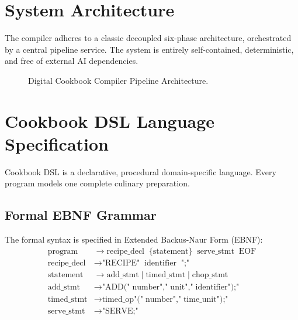 \documentclass[conference]{IEEEtran}
\begin{document}
\section{System Architecture}
The compiler adheres to a classic decoupled six-phase architecture, orchestrated by a central pipeline service. The system is entirely self-contained, deterministic, and free of external AI dependencies.

\begin{figure}[htbp]
\centering
{}
\caption{Digital Cookbook Compiler Pipeline Architecture.}
\label{fig:architecture}
\end{figure}

\section{Cookbook DSL Language Specification}
Cookbook DSL is a declarative, procedural domain-specific language. Every program models one complete culinary preparation.

\subsection{Formal EBNF Grammar}
The formal syntax is specified in Extended Backus-Naur Form (EBNF):
\begin{align*}
\text{program} &\to \text{recipe\_decl}\;\;\{\text{statement}\}\;\;\text{serve\_stmt}\;\;\text{EOF} \\
\text{recipe\_decl} &\to \text{"RECIPE"}\;\;\text{identifier}\;\;\text{";"} \\
\text{statement} &\to \text{add\_stmt} \mid \text{timed\_stmt} \mid \text{chop\_stmt} \\
\text{add\_stmt} &\to \text{"ADD("}\;\text{number}\text{","}\;\text{unit}\text{","}\;\text{identifier}\text{");"} \\
\text{timed\_stmt} &\to \text{timed\_op}\text{"("}\;\text{number}\text{","}\;\text{time\_unit}\text{");"} \\
\text{serve\_stmt} &\to \text{"SERVE;"}
\end{align*}
\end{document}
